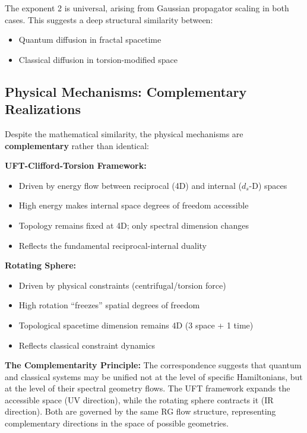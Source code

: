 \documentclass[12pt,a4paper]{article}
\begin{document}
The exponent 2 is universal, arising from Gaussian propagator scaling in both cases. This suggests a deep structural similarity between:
\begin{itemize}
    \item Quantum diffusion in fractal spacetime
    \item Classical diffusion in torsion-modified space
\end{itemize}

\subsection{Physical Mechanisms: Complementary Realizations}

Despite the mathematical similarity, the physical mechanisms are \textbf{complementary} rather than identical:

\textbf{UFT-Clifford-Torsion Framework:}
\begin{itemize}
    \item Driven by energy flow between reciprocal (4D) and internal ($d_s$-D) spaces
    \item High energy makes internal space degrees of freedom accessible
    \item Topology remains fixed at 4D; only spectral dimension changes
    \item Reflects the fundamental reciprocal-internal duality
\end{itemize}

\textbf{Rotating Sphere:}
\begin{itemize}
    \item Driven by physical constraints (centrifugal/torsion force)
    \item High rotation ``freezes'' spatial degrees of freedom
    \item Topological spacetime dimension remains 4D (3 space + 1 time)
    \item Reflects classical constraint dynamics
\end{itemize}

\textbf{The Complementarity Principle:} The correspondence suggests that quantum and classical systems may be unified not at the level of specific Hamiltonians, but at the level of their spectral geometry flows. The UFT framework expands the accessible space (UV direction), while the rotating sphere contracts it (IR direction). Both are governed by the same RG flow structure, representing complementary directions in the space of possible geometries.
\end{document}
